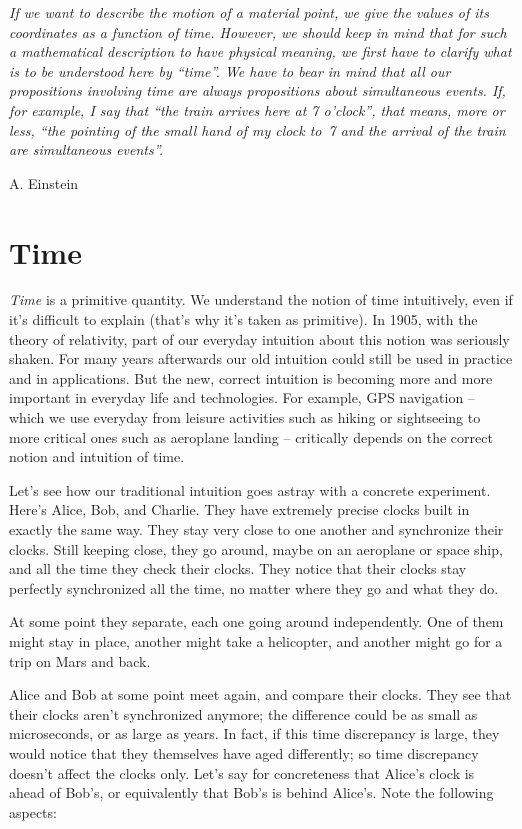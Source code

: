 \documentclass[a4paper,12pt,%
onecolumn,oneside,titlepage,%
british%
]{memoir}
\renewcommand*{\|}[1][]{\nonscript\:#1\vert\nonscript\:\mathopen{}}
\begin{document}
\epigraph{\emph{If we want to describe the \emph{motion} of a material point, we give the values of its coordinates as a function of time. However, we should keep in mind that for such a mathematical description to have physical meaning, we first have to clarify what is to be understood here by \enquote{time}. We have to bear in mind that all our propositions involving time are always propositions about \emph{simultaneous events}. If, for example, I say that \enquote{the train arrives here at 7 o'clock}, that means, more or less, \enquote{the pointing of the small hand of my clock to~7 and the arrival of the train are simultaneous events}.}}{A. Einstein \cites*{einstein1905c}}

\section{Time}
\label{sec:time}

\emph{Time} is a primitive quantity. We understand the notion of time intuitively, even if it's difficult to explain (that's why it's taken as primitive). In 1905, with the theory of relativity, part of our everyday intuition about this notion was seriously shaken. For many years afterwards our old intuition could still be used in practice and in applications. But the new, correct intuition is becoming more and more important in everyday life and technologies. For example, GPS navigation -- which we use everyday from leisure activities such as hiking or sightseeing to more critical ones such as aeroplane landing -- critically depends on the correct notion and intuition of time.

Let's see how our traditional intuition goes astray with a concrete experiment. Here's Alice, Bob, and Charlie. They have extremely precise clocks built in exactly the same way. They stay very close to one another and synchronize their clocks. Still keeping close, they go around, maybe on an aeroplane or space ship, and all the time they check their clocks. They notice that their clocks stay perfectly synchronized all the time, no matter where they go and what they do.

At some point they separate, each one going around independently. One of them might stay in place, another might take a helicopter, and another might go for a trip on Mars and back.

Alice and Bob at some point meet again, and compare their clocks. They see that their clocks aren't synchronized anymore; the difference could be as small as microseconds, or as large as years. In fact, if this time discrepancy is large, they would notice that they themselves have aged differently; so time discrepancy doesn't affect the clocks only. Let's say for concreteness that Alice's clock is ahead of Bob's, or equivalently that Bob's is behind Alice's. Note the following aspects:
\end{document}
